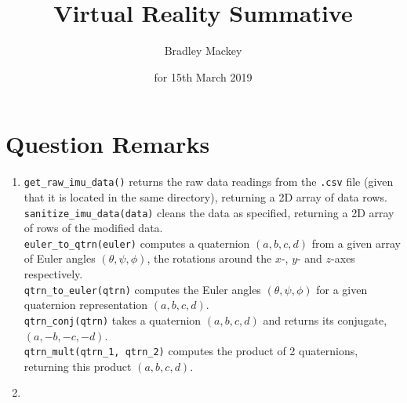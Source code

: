 \documentclass[11pt]{article}
\makeatletter
\newcommand{\skipitems}[1]{%
  \addtocounter{\@enumctr}{#1}%
}
\makeatother
\begin{document}
\title{\textbf{Virtual Reality Summative}}
\date{for 15th March 2019}
\author{Bradley Mackey}
\maketitle


\section*{Question Remarks}

\begin{enumerate}
\item 
\texttt{get\_raw\_imu\_data()} returns the raw data readings from the \texttt{.csv} file (given that it is located in the same directory), returning a 2D array of data rows.\\
\texttt{sanitize\_imu\_data(data)} cleans the data as specified, returning a 2D array of rows of the modified data.\\
\texttt{euler\_to\_qtrn(euler)} computes a quaternion $(a,b,c,d)$ from a given array of Euler angles $(\theta,\psi,\phi)$, the rotations around the $x$-, $y$- and $z$-axes respectively.\\
\texttt{qtrn\_to\_euler(qtrn)} computes the Euler angles $(\theta,\psi,\phi)$ for a given quaternion representation $(a,b,c,d)$.\\
\texttt{qtrn\_conj(qtrn)} takes a quaternion $(a,b,c,d)$ and returns its conjugate, $(a,-b,-c,-d)$.\\
\texttt{qtrn\_mult(qtrn\_1, qtrn\_2)} computes the product of 2 quaternions, returning this product $(a,b,c,d)$.

\skipitems{1} 


\item 


\end{enumerate}
\end{document}
